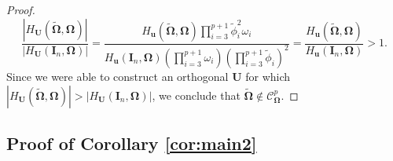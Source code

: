 \documentclass[12pt]{article}
\newcommand{\bl}[1]{{\mathbf #1}}
\newcommand{\bs}[1]{\boldsymbol #1}
\begin{document}
\begin{proof}
\begin{equation*}
    \frac{|H_{\bl{U}}(\tilde{\bs{\Omega}}, \bs{\Omega})|}{|H_{\bl{U}}(\bl{I}_n, \bs{\Omega})|} = \frac{H_{\bl{u}}(\tilde{\bs{\Omega}}, \bs{\Omega}) \prod_{i=3}^{p+1} \tilde{\phi}_i^2 \omega_i }{H_{\bl{u}}(\bl{I}_n, \bs{\Omega}) (\prod_{i=3}^{p+1} \omega_i) (\prod_{i=3}^{p+1} \tilde{\phi}_i)^2} = \frac{H_{\bl{u}}(\tilde{\bs{\Omega}}, \bs{\Omega})}{H_{\bl{u}}(\bl{I}_n, \bs{\Omega})} > 1.
\end{equation*}
Since we were able to construct an orthogonal $\bl{U}$ for which $|H_{\bl{U}}(\tilde{\bs{\Omega}}, \bs{\Omega})| > |H_{\bl{U}}(\bl{I}_n, \bs{\Omega})|$, we conclude that $\tilde{\bs{\Omega}} \notin \mathcal{C}^p_{\bs{\Omega}}$.
\end{proof}

\subsection{{Proof of Corollary \ref{cor:main2}}}
\end{document}
